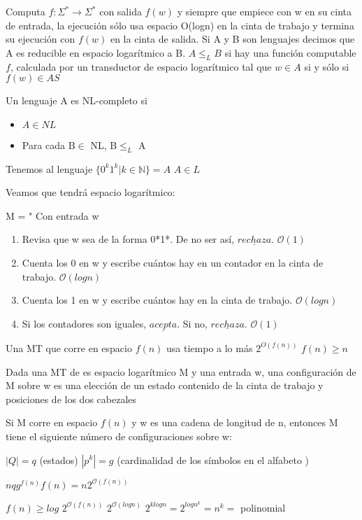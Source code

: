 \documentclass{homework}
\begin{document}
Computa $f:\Sigma^* \to \Sigma^*$ con salida $f(w)$ y siempre que empiece con w en su cinta de entrada, la ejecución sólo usa espacio O(logn) en la cinta de trabajo y termina su ejecución con $f(w)$ en la cinta de salida. Si A y B son lenguajes decimos que A es reducible en espacio logarítmico a B. $A \leq_{L} B$ si hay una función computable $f$, calculada por un transductor de espacio logarítmico tal que $w \in A$ si y sólo si $f(w) \in AS$

Un lenguaje A es NL-completo si
 \begin{itemize}
 	\item $A \in NL$
 	\item Para cada B$ \in$ NL, B$\leq_L$ A
 \end{itemize}

Tenemos al lenguaje $\{0^k 1^k | k \in \mathds{N}\} = A$ $A \in L$

Veamos que tendrá espacio logarítmico:

M = " Con entrada w
\begin{enumerate}
\item Revisa que w sea de la forma 0*1*. De no ser así, $\underline{rechaza}$. $\mathcal{O}(1)$
\item Cuenta los 0 en w y escribe cuántos hay en un contador en la cinta de trabajo. $\mathcal{O}(log n)$
\item Cuenta los 1 en w y escribe cuántos hay en la cinta de trabajo. $\mathcal{O}(log n)$
\item Si los contadores son iguales, $\underline{acepta}$. Si no, $\underline{rechaza}$. $\mathcal{O}(1)$
\end{enumerate}

Una MT que corre en espacio $f(n)$ usa tiempo a lo más $2^{O(f(n))}$  $f(n) \geq n$

Dada una MT de es espacio logarítmico M y una entrada w, una configuración de M sobre w es una elección de un estado contenido de la cinta de trabajo y posiciones de los dos cabezales

Si M corre en espacio $f(n)$ y w es una cadena de longitud de n, entonces M tiene el siguiente número de configuraciones sobre w:

$|Q|= q$ (estados) $|p^k|= g$ (cardinalidad de los símbolos en el alfabeto )

$nqg^{f(n)}f(n) = n2^{\mathcal{O}(f(n))}$

$f(n)\geq log$
$2^{\mathcal{O}(f(n))}$  $2^{\mathcal{O}(log n)}$
$2^{klogn} = 2^{logn^k} = n^k =$ polinomial
\end{document}
